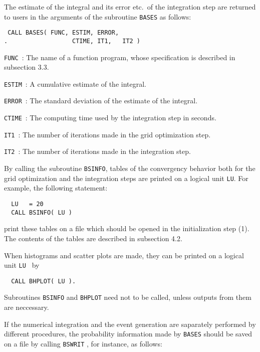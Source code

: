 The estimate of the
integral and its error etc.~of the integration step are returned to users in the
arguments of the subroutine {\tt BASES} as follows:
{\small
\begin{verbatim}
 CALL BASES( FUNC, ESTIM, ERROR, 
.                  CTIME, IT1,   IT2 )
\end{verbatim}}
\par\noindent
{\small
\begin{description}
\item{\tt FUNC}~: The name of a function program, whose specification is
described in subsection 3.3.  
\item{\tt ESTIM}~: A cumulative estimate of the integral.  
\item{\tt ERROR}~: The standard deviation of the estimate of the integral. 
\item{\tt CTIME}~: The computing time used by the integration step in seconds. 
\item{\tt IT1}~: The number of iterations made in the grid optimization
step.  
\item{\tt IT2}~: The number of iterations made in the
integration step. 
\end{description}} 
\par
By calling the subroutine {\tt BSINFO}, tables of the convergency behavior both
for the grid optimization and the integration steps are printed on a logical
unit
 {\small\tt LU}.
For example, the following statement:
\par
{\small\begin{verbatim}
  LU   = 20
  CALL BSINFO( LU )
\end{verbatim}}
\par\noindent
print these tables on a file which
should be opened in the initialization step (1).
The contents of the tables are described in subsection 4.2.
\par  
When histograms and scatter plots are made, they
can be printed on a logical unit {\small\tt LU } by  
\par
{\small\begin{verbatim}
  CALL BHPLOT( LU ).
\end{verbatim}}
\par
Subroutines {\tt BSINFO} and {\tt BHPLOT} need not to be called, unless outputs
from them are neccessary.   \par
If the numerical integration and the event generation are saparately performed
by different procedures, the probability information made by {\tt BASES} should
be saved on a file by calling {\tt BSWRIT} , for instance, as follows:
